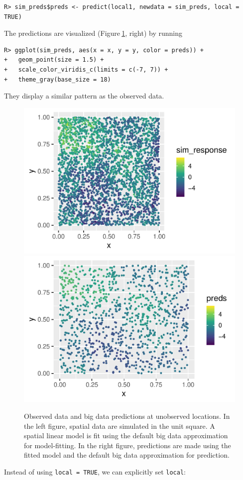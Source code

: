 \documentclass[10pt,letterpaper]{article}
\begin{document}
\begin{verbatim}
R> sim_preds$preds <- predict(local1, newdata = sim_preds, local = TRUE)
\end{verbatim}

The predictions are visualized (Figure\(~\)\ref{fig:sim_preds}, right)
by running

\begin{verbatim}
R> ggplot(sim_preds, aes(x = x, y = y, color = preds)) +
+   geom_point(size = 1.5) +
+   scale_color_viridis_c(limits = c(-7, 7)) + 
+   theme_gray(base_size = 18)
\end{verbatim}

They display a similar pattern as the observed data.

\begin{figure}

{\centering \includegraphics[width=0.49\linewidth]{preprint_old_files/figure-latex/sim_preds-1} \includegraphics[width=0.49\linewidth]{preprint_old_files/figure-latex/sim_preds-2} 

}

\caption{Observed data and big data predictions at unobserved locations. In the left figure, spatial data are simulated in the unit square. A spatial linear model is fit using the default big data approximation for model-fitting. In the right figure, predictions are made using the fitted model and the default big data approximation for prediction.}\label{fig:sim_preds}
\end{figure}

Instead of using \texttt{local\ =\ TRUE}, we can explicitly set
\texttt{local}:
\end{document}
